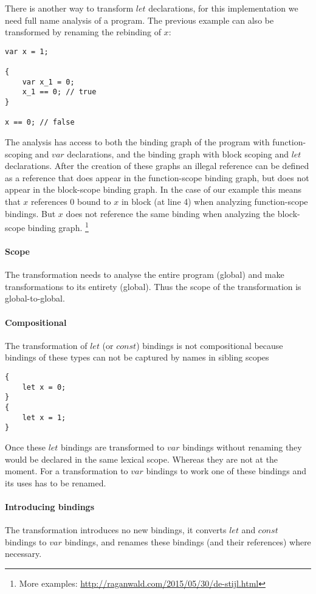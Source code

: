 There is another way to transform $let$ declarations, for this implementation we need full name analysis of a program. The previous example can also be transformed by renaming the rebinding of $x$:

\begin{lstlisting}
var x = 1;

{
	var x_1 = 0;
	x_1 == 0; // true
}

x == 0; // false
\end{lstlisting}

The analysis has access to both the binding graph of the program with function-scoping and $var$ declarations, and the binding graph with block scoping and $let$ declarations. After the creation of these graphs an illegal reference can be defined as a reference that does appear in the function-scope binding graph, but does not appear in the block-scope binding graph. In the case of our example this means that $x$ references 0 bound to $x$ in block (at line 4) when analyzing function-scope bindings. But $x$ does not reference the same binding when analyzing the block-scope binding graph. \footnote{More examples: \url{http://raganwald.com/2015/05/30/de-stijl.html}}

\paragraph{Scope}
The transformation needs to analyse the entire program (global) and make transformations to its entirety (global). Thus the scope of the transformation is global-to-global.

\paragraph{Compositional}
The transformation of $let$ (or $const$) bindings is not compositional because bindings of these types can not be captured by names in sibling scopes

\begin{lstlisting}
{
	let x = 0;
}
{
	let x = 1;
}
\end{lstlisting} 

Once these $let$ bindings are transformed to $var$ bindings without renaming they would be declared in the same lexical scope. Whereas they are not at the moment. For a transformation to $var$ bindings to work one of these bindings and its uses has to be renamed.

\paragraph{Introducing bindings}
The transformation introduces no new bindings, it converts $let$ and $const$ bindings to $var$ bindings, and renames these bindings (and their references) where necessary.


